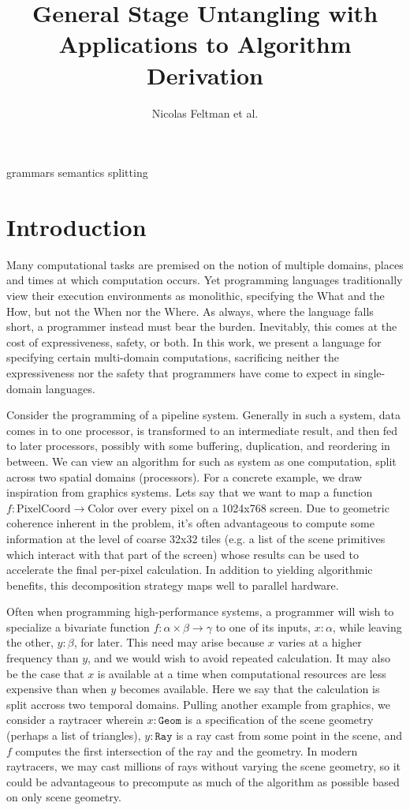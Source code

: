 \documentclass{article}
\title{\Large\textbf{General Stage Untangling with Applications to Algorithm Derivation}}
\author{Nicolas Feltman et al.}
\begin{document}
\maketitle

 {grammars}
 {semantics}
 {splitting}

\section{Introduction}

Many computational tasks are premised on the notion of multiple domains, places and times at which computation occurs.  Yet programming languages traditionally view their execution environments as monolithic, specifying the What and the How, but not the When nor the Where.   As always, where the language falls short, a programmer instead must bear the burden.  Inevitably, this comes at the cost of expressiveness, safety, or both.  In this work, we present a language for specifying certain multi-domain computations, sacrificing neither the expressiveness nor the safety that programmers have come to expect in single-domain languages.

Consider the programming of a pipeline system.  Generally in such a system, data comes in to one processor, is transformed to an intermediate result, and then fed to later processors, possibly with some buffering, duplication, and reordering in between.  We can view an algorithm for such as system as one computation, split across two spatial domains (processors).  For a concrete example, we draw inspiration from graphics systems.  Lets say that we want to map a function $f : \mathrm{PixelCoord} \to \mathrm{Color}$ over every pixel on a 1024x768 screen.   Due to geometric coherence inherent in the problem, it's often advantageous to compute some information at the level of coarse 32x32 tiles (e.g. a list of the scene primitives which interact with that part of the screen) whose results can be used to accelerate the final per-pixel calculation.  In addition to yielding algorithmic benefits, this decomposition strategy maps well to parallel hardware.

Often when programming high-performance systems, a programmer will wish to specialize a bivariate function $f : \alpha \times \beta \to \gamma$ to one of its inputs, $x : \alpha$, while leaving the other, $y : \beta$, for later.  This need may arise because $x$ varies at a higher frequency than $y$, and we would wish to avoid repeated calculation. It may also be the case that $x$ is available at a time when computational resources are less expensive than when $y$ becomes available.  Here we say that the calculation is split accross two temporal domains.  Pulling another example from graphics, we consider a raytracer wherein $x : \mathtt{Geom}$ is a specification of the scene geometry (perhaps a list of triangles), $y : \mathtt{Ray}$ is a ray cast from some point in the scene, and $f$ computes the first intersection of the ray and the geometry.  In modern raytracers, we may cast millions of rays without varying the scene geometry, so it could be advantageous to precompute as much of the algorithm as possible based on only scene geometry.
\end{document}
